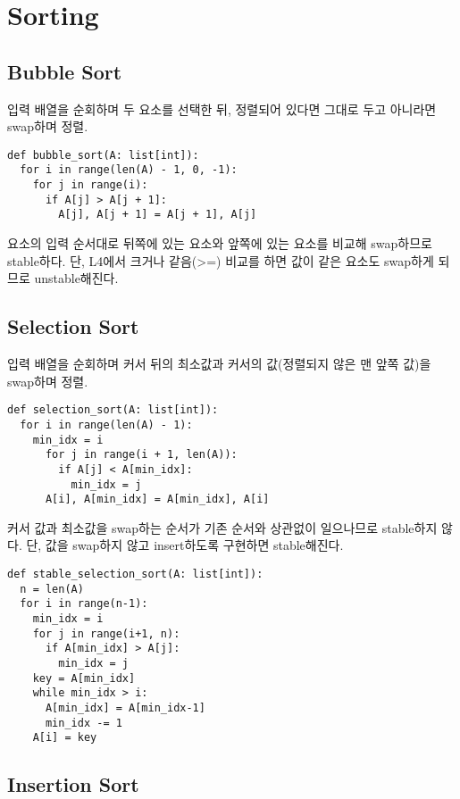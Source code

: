 \section{Sorting}

\subsection{Bubble Sort}

입력 배열을 순회하며 두 요소를 선택한 뒤, 정렬되어 있다면 그대로 두고 아니라면 swap하며 정렬.

\begin{verbatim}
def bubble_sort(A: list[int]):
  for i in range(len(A) - 1, 0, -1):
    for j in range(i):
      if A[j] > A[j + 1]:
        A[j], A[j + 1] = A[j + 1], A[j]
\end{verbatim}

요소의 입력 순서대로 뒤쪽에 있는 요소와 앞쪽에 있는 요소를 비교해 swap하므로 stable하다. 단, L4에서 크거나 같음(>=) 비교를 하면 값이 같은 요소도 swap하게 되므로 unstable해진다.

\subsection{Selection Sort}

입력 배열을 순회하며 커서 뒤의 최소값과 커서의 값(정렬되지 않은 맨 앞쪽 값)을 swap하며 정렬.

\begin{verbatim}
def selection_sort(A: list[int]):
  for i in range(len(A) - 1):
    min_idx = i
      for j in range(i + 1, len(A)):
        if A[j] < A[min_idx]:
          min_idx = j
      A[i], A[min_idx] = A[min_idx], A[i]
\end{verbatim}

커서 값과 최소값을 swap하는 순서가 기존 순서와 상관없이 일으나므로 stable하지 않다. 단, 값을 swap하지 않고 insert하도록 구현하면 stable해진다.

\begin{verbatim}
def stable_selection_sort(A: list[int]):
  n = len(A)
  for i in range(n-1):
    min_idx = i
    for j in range(i+1, n):
      if A[min_idx] > A[j]:
        min_idx = j
    key = A[min_idx]
    while min_idx > i:
      A[min_idx] = A[min_idx-1]
      min_idx -= 1
    A[i] = key
\end{verbatim}

\subsection{Insertion Sort}

